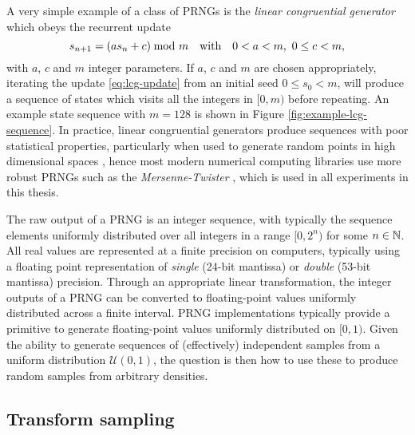 A very simple example of a class of \acp{PRNG} is the \emph{linear congruential generator} \citep{lehmer1951mathematical} which obeys the recurrent update
\begin{equation}\label{eq:lcg-update}
  s_{n+1} = (a s_n + c) \kern-4pt\mod m
  \quad \textrm{with} \quad
   0 < a < m,~ 0 \leq c < m,
\end{equation}
with $a$, $c$ and $m$ integer parameters. If $a$, $c$ and $m$ are chosen appropriately, iterating the update \eqref{eq:lcg-update} from an initial seed $0 \leq s_0 < m$, will produce a sequence of states which visits all the integers in $[0, m)$ before repeating. An example state sequence with $m=128$ is shown in Figure \ref{fig:example-lcg-sequence}. In practice, linear congruential generators produce sequences with poor statistical properties, particularly when used to generate random points in high dimensional spaces \citep{marsaglia1968random}, hence most modern numerical computing libraries use more robust \acp{PRNG} such as the \emph{Mersenne-Twister} \citep{matsumoto1998mersenne}, which is used in all experiments in this thesis.

The raw output of a \ac{PRNG} is an integer sequence, with typically the sequence elements uniformly distributed over all integers in a range $[0, 2^n)$ for some $n \in \mathbb{N}$. All real values are represented at a finite precision on computers, typically using a floating point representation \citep{ieee2008standard} of \emph{single} (24-bit mantissa) or \emph{double} (53-bit mantissa) precision. Through an appropriate linear transformation, the integer outputs of a \ac{PRNG} can be converted to floating-point values uniformly distributed across a finite interval. \ac{PRNG} implementations typically provide a primitive to generate floating-point values uniformly distributed on $[0, 1)$. Given the ability to generate sequences of (effectively) independent samples from a uniform distribution $\mathcal{U}(0,1)$, the question is then how to use these to produce random samples from arbitrary densities. %

\subsection{Transform sampling}

